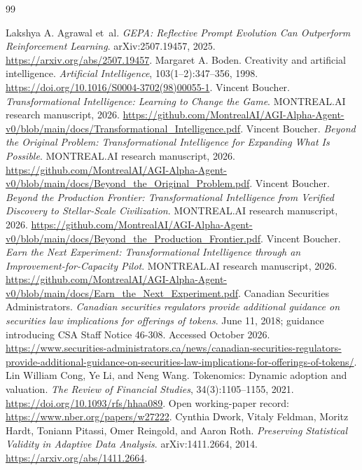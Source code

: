 \documentclass[11pt,letterpaper]{article}
\theoremstyle{remark}\newtheorem{remark}{Remark}[section]
\begin{document}
\begin{thebibliography}{99}
\footnotesize\raggedright\setlength{\itemsep}{.12em}\setlength{\parsep}{0pt}
Lakshya A. Agrawal et~al. \emph{GEPA: Reflective Prompt Evolution Can Outperform Reinforcement Learning}. arXiv:2507.19457, 2025. \url{https://arxiv.org/abs/2507.19457}.
Margaret A. Boden. Creativity and artificial intelligence. \emph{Artificial Intelligence}, 103(1--2):347--356, 1998. \url{https://doi.org/10.1016/S0004-3702(98)00055-1}.
Vincent Boucher. \emph{Transformational Intelligence: Learning to Change the Game}. MONTREAL.AI research manuscript, 2026. \url{https://github.com/MontrealAI/AGI-Alpha-Agent-v0/blob/main/docs/Transformational_Intelligence.pdf}.
Vincent Boucher. \emph{Beyond the Original Problem: Transformational Intelligence for Expanding What Is Possible}. MONTREAL.AI research manuscript, 2026. \url{https://github.com/MontrealAI/AGI-Alpha-Agent-v0/blob/main/docs/Beyond_the_Original_Problem.pdf}.
Vincent Boucher. \emph{Beyond the Production Frontier: Transformational Intelligence from Verified Discovery to Stellar-Scale Civilization}. MONTREAL.AI research manuscript, 2026. \url{https://github.com/MontrealAI/AGI-Alpha-Agent-v0/blob/main/docs/Beyond_the_Production_Frontier.pdf}.
Vincent Boucher. \emph{Earn the Next Experiment: Transformational Intelligence through an Improvement-for-Capacity Pilot}. MONTREAL.AI research manuscript, 2026. \url{https://github.com/MontrealAI/AGI-Alpha-Agent-v0/blob/main/docs/Earn_the_Next_Experiment.pdf}.
Canadian Securities Administrators. \emph{Canadian securities regulators provide additional guidance on securities law implications for offerings of tokens}. June 11, 2018; guidance introducing CSA Staff Notice 46-308. Accessed October 2026. \url{https://www.securities-administrators.ca/news/canadian-securities-regulators-provide-additional-guidance-on-securities-law-implications-for-offerings-of-tokens/}.
Lin William Cong, Ye Li, and Neng Wang. Tokenomics: Dynamic adoption and valuation. \emph{The Review of Financial Studies}, 34(3):1105--1155, 2021. \url{https://doi.org/10.1093/rfs/hhaa089}. Open working-paper record: \url{https://www.nber.org/papers/w27222}.
Cynthia Dwork, Vitaly Feldman, Moritz Hardt, Toniann Pitassi, Omer Reingold, and Aaron Roth. \emph{Preserving Statistical Validity in Adaptive Data Analysis}. arXiv:1411.2664, 2014. \url{https://arxiv.org/abs/1411.2664}.

\end{thebibliography}
\end{document}
